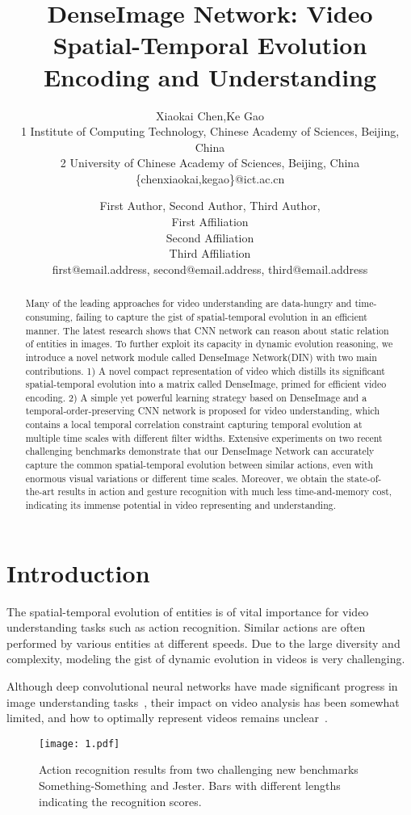\documentclass{article}
\title{DenseImage Network: Video Spatial-Temporal Evolution \\ Encoding and Understanding}
\author{Xiaokai Chen,Ke Gao\\
1 Institute of Computing Technology, Chinese Academy of Sciences, Beijing, China\\
2 University of Chinese Academy of Sciences, Beijing, China\\
\{chenxiaokai,kegao\}@ict.ac.cn}
\author{
First Author, 
Second Author, 
Third Author, 
\\ 
 First Affiliation \\
 Second Affiliation\\
 Third Affiliation  \\
first@email.address,
second@email.address,
third@email.address
}
\begin{document}
\maketitle

\begin{abstract}
Many of the leading approaches for video understanding are data-hungry and time-consuming, failing to capture the gist of spatial-temporal evolution in an efficient manner. The latest research shows that CNN network can reason about static relation of entities in images. To further exploit its capacity in dynamic evolution reasoning, we introduce a novel network module called DenseImage Network(DIN) with two main contributions. 1) A novel compact representation of video which distills its significant spatial-temporal evolution into a matrix called DenseImage, primed for efficient video encoding. 2) A simple yet powerful learning strategy based on DenseImage and a temporal-order-preserving CNN network is proposed for video understanding, which contains a local temporal correlation constraint capturing temporal evolution at multiple time scales with different filter widths. Extensive experiments on two recent challenging benchmarks demonstrate that our DenseImage Network can accurately capture the common spatial-temporal evolution between similar actions, even with enormous visual variations or different time scales. Moreover, we obtain the state-of-the-art results in action and gesture recognition with much less time-and-memory cost, indicating its immense potential in video representing and understanding.
\end{abstract}

\section{Introduction}
The spatial-temporal evolution of entities is of vital importance for video understanding tasks such as action recognition. Similar actions are often performed by various entities at different speeds. Due to the large diversity and complexity, modeling the gist of dynamic evolution in videos is very challenging.

Although deep convolutional neural networks have made significant progress in image understanding tasks~\cite{BadrinarayananK15,VinyalsTBE15}, their impact on video analysis has been somewhat limited, and how to optimally represent videos remains unclear~\cite{SigurdssonRG17}.
\begin{figure}
	\begin{center}
		\texttt{[image: 1.pdf]}
		\caption{Action recognition results from two challenging new benchmarks Something-Something and Jester. Bars with different lengths indicating the recognition scores.}
		\label{Figure 1.}
	\end{center}
	\vspace{-0.5em}
\end{figure}
\end{document}
